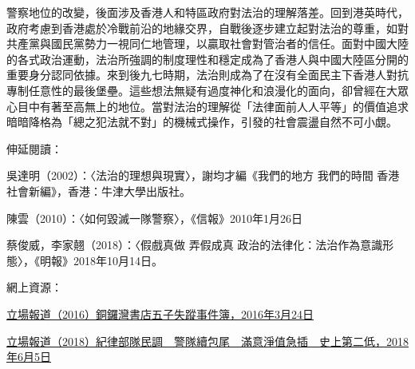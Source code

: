 警察地位的改變，後面涉及香港人和特區政府對法治的理解落差。回到港英時代，政府考慮到香港處於冷戰前沿的地緣交界，自戰後逐步建立起對法治的尊重，如對共產黨與國民黨勢力一視同仁地管理，以贏取社會對管治者的信任。面對中國大陸的各式政治運動，法治所強調的制度理性和穩定成為了香港人與中國大陸區分開的重要身分認同依據。來到後九七時期，法治則成為了在沒有全面民主下香港人對抗專制任意性的最後堡壘。這些想法無疑有過度神化和浪漫化的面向，卻曾經在大眾心目中有著至高無上的地位。當對法治的理解從「法律面前人人平等」的價值追求暗暗降格為「總之犯法就不對」的機械式操作，引發的社會震盪自然不可小覷。



伸延閱讀：

吳達明（2002）：〈法治的理想與現實〉，謝均才編《我們的地方 我們的時間 香港社會新編》，香港：牛津大學出版社。

陳雲（2010）：〈如何毀滅一隊警察〉，《信報》2010年1月26日

蔡俊威，李家翹（2018）：〈假戲真做 弄假成真 政治的法律化：法治作為意識形態〉，《明報》2018年10月14日。

網上資源：

\href{http://www.thestand.news/politics/銅鑼灣書店五子失蹤事件簿/}{立場報道（2016）銅鑼灣書店五子失蹤事件簿，2016年3月24日}

\href{https://thestandnews.com/society/紀律部隊民調續包尾-警隊滿意淨值急插-史上第二低/}{立場報道（2018）紀律部隊民調　警隊續包尾　滿意淨值急插　史上第二低，2018年6月5日}
